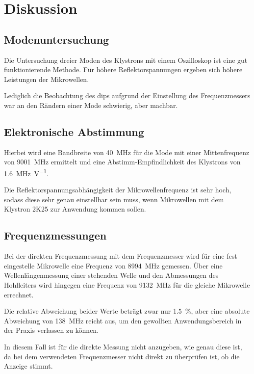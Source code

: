 
\section{Diskussion}
%
\subsection{Modenuntersuchung}
%
Die Untersuchung dreier Moden des Klystrons mit einem 
Oszilloskop ist eine gut funktionierende Methode. 
Für höhere Reflektorspannungen ergeben sich höhere Leistungen 
der Mikrowellen.

Lediglich die Beobachtung des dips aufgrund der Einstellung des 
Frequenzmessers war an den Rändern einer Mode schwierig, aber 
machbar.
%
\subsection{Elektronische Abstimmung}
%
Hierbei wird eine Bandbreite von \SI{40}{\mega\hertz} für die Mode 
mit einer Mittenfrequenz von \SI{9001}{\mega\hertz} ermittelt und 
eine Abstimm-Empfindlichkeit des Klystrons von 
\SI{1.6}{\mega\hertz\per\volt}. 

Die Reflektorspannungsabhängigkeit der Mikrowellenfrequenz ist 
sehr hoch, sodass diese sehr genau einstellbar sein muss, wenn 
Mikrowellen mit dem Klystron 2K25 zur Anwendung kommen sollen.
%
\subsection{Frequenzmessungen}
%
Bei der direkten Frequenzmessung mit dem Frequenzmesser wird 
für eine fest eingestelle Mikrowelle eine Frequenz von 
\SI{8994}{\mega\hertz} gemessen. Über eine Wellenlängenmessung 
einer stehenden Welle und den Abmessungen des Hohlleiters wird 
hingegen eine Frequenz von \SI{9132}{\mega\hertz} für die gleiche 
Mikrowelle errechnet. 

Die relative Abweichung beider Werte beträgt zwar nur 
\SI{1.5}{\percent}, aber eine absolute Abweichung von 
\SI{138}{\mega\hertz} reicht aus, um den gewollten 
Anwendungsbereich in der Praxis verlassen zu können. 

In diesem Fall ist für die direkte Messung nicht anzugeben, wie 
genau diese ist, da bei dem verwendeten Frequenzmesser nicht 
direkt zu überprüfen ist, ob die Anzeige stimmt. 

